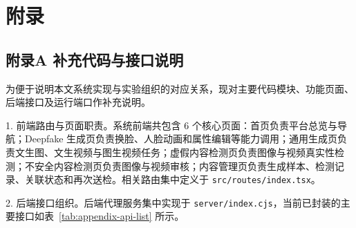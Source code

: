 \chapter*{附\qquad 录}
{}

\section*{附录A 补充代码与接口说明}
{}

为便于说明本文系统实现与实验组织的对应关系，现对主要代码模块、功能页面、后端接口及运行端口作补充说明。

1. 前端路由与页面职责。系统前端共包含 6 个核心页面：首页负责平台总览与导航；Deepfake 生成页负责换脸、人脸动画和属性编辑等能力调用；通用生成页负责文生图、文生视频与图生视频任务；虚假内容检测页负责图像与视频真实性检测；不安全内容检测页负责图像与视频审核；内容管理页负责生成样本、检测记录、关联状态和再次送检。相关路由集中定义于 \texttt{src/routes/index.tsx}。

2. 后端接口组织。后端代理服务集中实现于 \texttt{server/index.cjs}，当前已封装的主要接口如表~\ref{tab:appendix-api-list} 所示。


